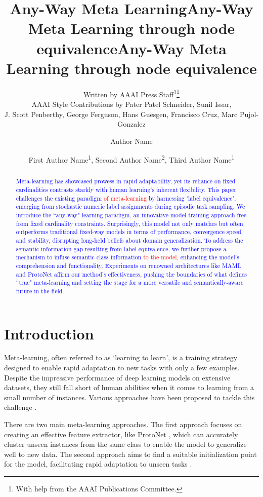 \documentclass[letterpaper]{article} %
\title{Any-Way Meta Learning}
\author{
    Written by AAAI Press Staff\textsuperscript{\rm 1}\thanks{With help from the AAAI Publications Committee.}\\
    AAAI Style Contributions by Pater Patel Schneider,
    Sunil Issar,\\
    J. Scott Penberthy,
    George Ferguson,
    Hans Guesgen,
    Francisco Cruz\equalcontrib,
    Marc Pujol-Gonzalez\equalcontrib
}
\title{Any-Way Meta Learning through node equivalence}
\author {
    Author Name
}
\title{Any-Way Meta Learning through node equivalence}
\author {
    First Author Name\textsuperscript{\rm 1},
    Second Author Name\textsuperscript{\rm 2},
    Third Author Name\textsuperscript{\rm 1}
}
\newcommand{\nj}[1]{\textcolor{red}{#1}}
\newcommand{\jh}[1]{\textcolor{blue}{#1}}
\begin{document}
\maketitle

\begin{abstract}
\jh{Meta-learning has showcased prowess in rapid adaptability, yet its reliance on fixed cardinalities contrasts starkly with human learning's inherent flexibility. This paper challenges the existing paradigm \nj{of meta-learning} by harnessing `label equivalence', emerging from stochastic numeric label assignments during episodic task sampling. We introduce the ``any-way" learning paradigm, an innovative model training approach free from fixed cardinality constraints. Surprisingly, this model not only matches but often outperforms traditional fixed-way models in terms of performance, convergence speed, and stability, disrupting long-held beliefs about domain generalization. To address the semantic information gap resulting from label equivalence, we further propose a mechanism to infuse semantic class information \nj{to the model}, enhancing the model's comprehension and functionality. Experiments on renowned architectures like MAML and ProtoNet affirm our method's effectiveness, pushing the boundaries of what defines ``true" meta-learning and setting the stage for a more versatile and semantically-aware future in the field.}
\end{abstract}

\section{Introduction}
Meta-learning, often referred to as `learning to learn', is a training strategy designed to enable rapid adaptation to new tasks with only a few examples. Despite the impressive performance of deep learning models on extensive datasets, they still fall short of human abilities when it comes to learning from a small number of instances. Various approaches have been proposed to tackle this challenge \cite{labelequiv:metadefinition}.

There are two main meta-learning approaches. The first approach focuses on creating an effective feature extractor, like ProtoNet \cite{episodic:MBML:Protonet}, which can accurately cluster unseen instances from the same class to enable the model to generalize well to new data. The second approach aims to find a suitable initialization point for the model, facilitating rapid adaptation to unseen tasks \nj{\cite{episodic:GBML:MAML}}. 
\end{document}

